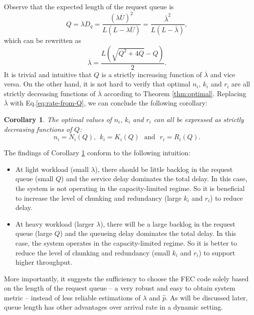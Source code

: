 \documentclass[journal]{IEEEtran}
\newcommand{\compVec}{\hat{p}}
\newcommand{\normArrival}{\overline{\lambda}}
\newcommand{\aveUsage}{\overline{U}}
\newtheorem{corollary}{\textbf{Corollary}}
\begin{document}
Observe that the expected length of the request queue is
\begin{equation}
Q = \lambda D_q= \frac{(\lambda \aveUsage)^2}{L(L-\lambda \aveUsage)} = \frac{\normArrival^2}{L(L-\normArrival)},
\label{eq:Q}
\end{equation}
which can be rewritten as
\begin{equation}
\normArrival = \frac{L\left(\sqrt{Q^2+4Q}-Q\right)}{2}.
\label{eq:rate-from-Q}
\end{equation}
It is trivial and intuitive that $Q$ is a strictly increasing function of $\normArrival$ and vice versa. On the other hand, it is not hard to verify that optimal $n_i$, $k_i$ and $r_i$ are all strictly decreasing functions of $\normArrival$ according to Theorem \ref{thm:optimal}. 
Replacing $\normArrival$ with Eq.\ref{eq:rate-from-Q}, we can conclude the following corollary:
\begin{corollary}
\label{corr:func_of_Q}
The optimal values of $n_i$, $k_i$ and $r_i$ can all be expressed as strictly decreasing functions of $Q$:
\begin{equation}
n_i = N_i(Q),~~k_i = K_i(Q) \text{~~and~~}  r_i = R_i(Q).
\label{eq:func_of_Q}
\end{equation}
\end{corollary}


The findings of Corollary \ref{corr:func_of_Q} conform to the following intuition: 
\begin{itemize}
\item At light workload (small $\lambda$), there should be little backlog in the request queue (small $Q$) and the service delay dominates the total delay. In this case, the system is not operating in the capacity-limited regime. So it is beneficial to increase the level of chunking and redundancy (large $k_i$ and $r_i$) to reduce delay.

\item At heavy workload (larger $\lambda$), there will be a large backlog in the request queue (large $Q$) and the queueing delay dominates the total delay. In this case, the system operates in the capacity-limited regime. So it is better to reduce the level of chunking and redundancy (small $k_i$ and $r_i$) to support higher throughput.
\end{itemize}
More importantly, it suggests the sufficiency to choose the FEC code solely based on the length of the request queue -- a very robust and easy to obtain system metric -- instead of less reliable estimations of $\lambda$ and $\compVec$. As will be discussed later, queue length has other advantages over arrival rate in a dynamic setting.
\end{document}

